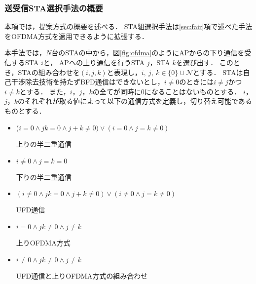 \documentclass[technicalreport]{ieicej}
\newcommand{\mN}{{\mathcal N}}
\newcommand{\sijk}{(i,j,k)}
\begin{document}
		\subsubsection{送受信STA選択手法の概要}\label{sec:pair_def}
			本項では，提案方式の概要を述べる．
			STA組選択手法は\ref{sec:fair}項で述べた手法をOFDMA方式を適用できるように拡張する．
			\par
			本手法では，$N$台のSTAの中から，図\ref{fig:ofdma}のようにAPからの下り通信を受信するSTA $i$と，
			APへの上り通信を行うSTA $j$，STA $k$を選び出す．
			このとき，STAの組み合わせを$\sijk$と表現し，$i,\ j,\ k \in \{0\}\cup \mN$とする．
			STAは自己干渉除去技術を持たずBFD通信はできないとし，$i\neq0$のときには$i\neq j$かつ$i\neq k$とする．
			また，$i$，$j$，$k$の全てが同時に0になることはないものとする．
			$i$，$j$，$k$のそれぞれが取る値によって以下の通信方式を定義し，切り替え可能であるものとする．
			\begin{itemize}%
				\item ($i=0\land jk=0\land j+k\neq0)\lor (i=0\land j=k\neq0)$\par
				\hspace*{15pt}上りの半二重通信
				\item $i\neq0\land j=k=0$\par
				\hspace*{15pt}下りの半二重通信
				\item $(i\neq0\land jk=0 \land j+k\neq0)\lor(i\neq0\land j=k\neq0)$\par
				\hspace*{15pt}UFD通信
				\item $i=0\land jk\neq0 \land j\neq k$\par
				\hspace*{15pt}上りOFDMA方式
				\item $i\neq0 \land jk\neq0 \land j\neq k$\par
				\hspace*{15pt}UFD通信と上りOFDMA方式の組み合わせ
			\end{itemize}
			\par
\end{document}
